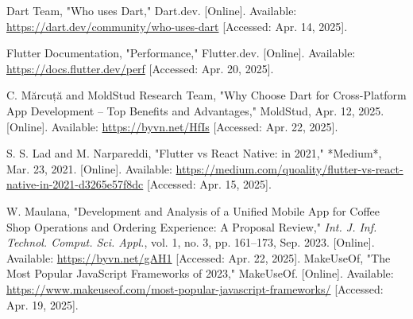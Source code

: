 \documentclass[12pt]{report}
\begin{document}
\begin{thebibliography}{1}
Dart Team, "Who uses Dart," Dart.dev. [Online]. Available: \url{https://dart.dev/community/who-uses-dart} [Accessed: Apr. 14, 2025].

Flutter Documentation, "Performance," Flutter.dev. [Online]. Available: \url{https://docs.flutter.dev/perf} [Accessed: Apr. 20, 2025].

C. Mărcuță and MoldStud Research Team, "Why Choose Dart for Cross-Platform App Development – Top Benefits and Advantages," MoldStud, Apr. 12, 2025. [Online]. Available: \url{https://byvn.net/HfIs} [Accessed: Apr. 22, 2025].

S. S. Lad and M. Narpareddi, "Flutter vs React Native: in 2021," *Medium*, Mar. 23, 2021. [Online]. Available: \url{https://medium.com/quoality/flutter-vs-react-native-in-2021-d3265e57f8dc} [Accessed: Apr. 15, 2025].

W. Maulana, "Development and Analysis of a Unified Mobile App for Coffee Shop Operations and Ordering Experience: A Proposal Review," \textit{Int. J. Inf. Technol. Comput. Sci. Appl.}, vol. 1, no. 3, pp. 161--173, Sep. 2023. [Online]. Available: \url{https://byvn.net/gAH1} [Accessed: Apr. 22, 2025].
MakeUseOf, "The Most Popular JavaScript Frameworks of 2023," MakeUseOf. [Online]. Available: \url{https://www.makeuseof.com/most-popular-javascript-frameworks/} [Accessed: Apr. 19, 2025].

\end{thebibliography}
\end{document}
